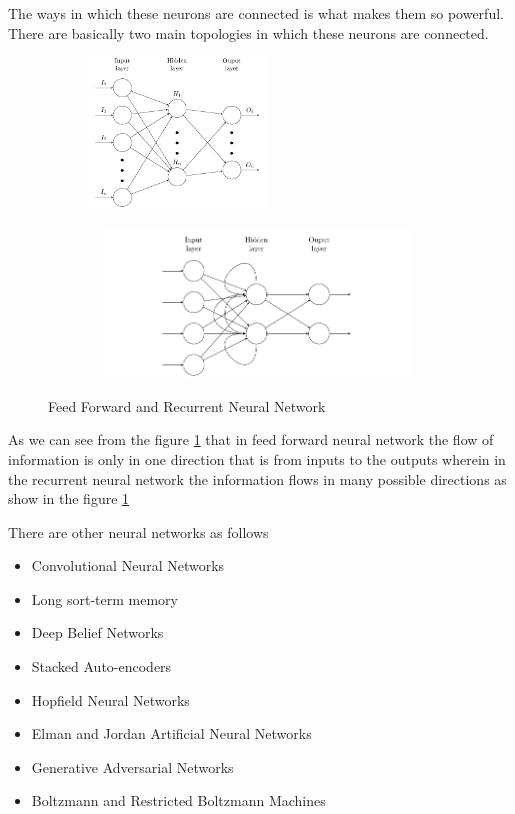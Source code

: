 \documentclass[12pt, a4paper]{report}
\begin{document}
The ways in which these neurons are connected is what makes them so powerful. There are basically two main topologies in which these neurons are connected. 
\begin{figure}[h]
\centering
  \begin{subfigure}[b]{0.4\textwidth}
    \includegraphics[width=\textwidth,height=4cm]{nn_2.png}
    
  \end{subfigure}
  \begin{subfigure}[b]{0.4\textwidth}
    \includegraphics[width=9cm,height=4cm]{rnn.png}
  \end{subfigure}
  \caption{Feed Forward and Recurrent Neural Network}
 \label{fig:FFRN}
\end{figure}

As we can see from the figure \ref{fig:FFRN} that in feed forward neural network the flow of information is only in one direction that is from inputs to the outputs wherein in the recurrent neural network the information flows in many possible directions as show in the figure \ref{fig:FFRN} \\ \par
\clearpage
There are other neural networks as follows
\begin{itemize}
	\item Convolutional Neural Networks
	\item Long sort-term memory
	\item Deep Belief Networks
	\item Stacked Auto-encoders
	\item Hopfield Neural Networks 
	\item Elman and Jordan Artificial Neural Networks
	\item Generative Adversarial Networks
	\item Boltzmann and Restricted Boltzmann Machines
\end{itemize}
\end{document}
